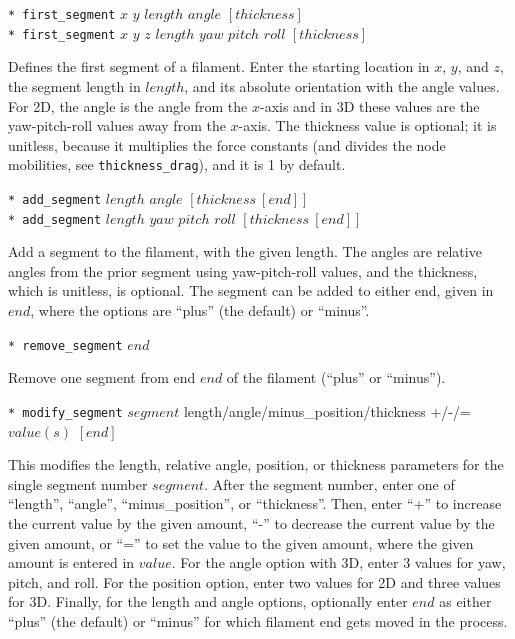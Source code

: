 \documentclass {scrbook}
\newcommand {\ttt} {\texttt}
\begin{document}
\begin{description}
\item{\ttt{* first\_segment} $x$ $y$ $length$ $angle$ $[thickness]$\\
\ttt{* first\_segment} $x$ $y$ $z$ $length$ $yaw$ $pitch$ $roll$ $[thickness]$}

Defines the first segment of a filament. Enter the starting location in $x$, $y$, and $z$, the segment length in $length$, and its absolute orientation with the angle values. For 2D, the angle is the angle from the $x$-axis and in 3D these values are the yaw-pitch-roll values away from the $x$-axis. The thickness value is optional; it is unitless, because it multiplies the force constants (and divides the node mobilities, see \ttt{thickness\_drag}), and it is 1 by default.

\item{\ttt{* add\_segment} $length$ $angle$ $[thickness\ [end]]$\\
\ttt{* add\_segment} $length$ $yaw$ $pitch$ $roll$ $[thickness\ [end]]$}

Add a segment to the filament, with the given length. The angles are relative angles from the prior segment using yaw-pitch-roll values, and the thickness, which is unitless, is optional. The segment can be added to either end, given in $end$, where the options are ``plus'' (the default) or ``minus''.

\item{\ttt{* remove\_segment} $end$}

Remove one segment from end $end$ of the filament (``plus'' or ``minus'').

\item{\ttt{* modify\_segment} $segment$ length/angle/minus\_position/thickness +/-/= $value(s)$ $[end]$}

This modifies the length, relative angle, position, or thickness parameters for the single segment number $segment$. After the segment number, enter one of ``length'', ``angle'', ``minus\_position'', or ``thickness''. Then, enter ``+'' to increase the current value by the given amount, ``-'' to decrease the current value by the given amount, or ``='' to set the value to the given amount, where the given amount is entered in $value$. For the angle option with 3D, enter 3 values for yaw, pitch, and roll. For the position option, enter two values for 2D and three values for 3D. Finally, for the length and angle options, optionally enter $end$ as either ``plus'' (the default) or ``minus'' for which filament end gets moved in the process.


\end{description}
\end{document}
